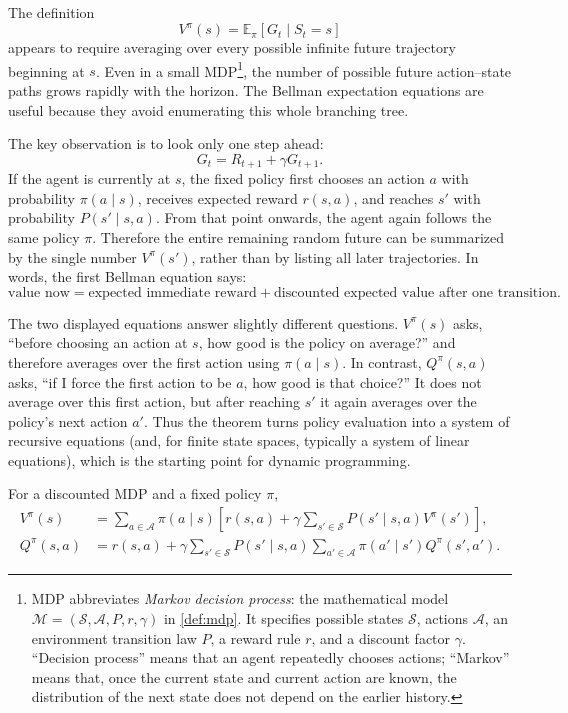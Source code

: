 \documentclass[11pt,a4paper]{article}
\theoremstyle{definition}
\begin{document}
\begin{remark}
The definition
\[
V^\pi(s)=\mathbb{E}_\pi[G_t\mid S_t=s]
\]
appears to require averaging over every possible infinite future trajectory beginning at
$s$. Even in a small MDP\footnote{MDP abbreviates \emph{Markov decision process}: the
mathematical model $\mathcal{M}=(\mathcal{S},\mathcal{A},P,r,\gamma)$ in \cref{def:mdp}.
It specifies possible states $\mathcal{S}$, actions $\mathcal{A}$, an environment transition
law $P$, a reward rule $r$, and a discount factor $\gamma$. ``Decision process'' means that
an agent repeatedly chooses actions; ``Markov'' means that, once the current state and
current action are known, the distribution of the next state does not depend on the earlier
history.}, the number of possible future action--state paths grows rapidly
with the horizon. The Bellman expectation equations are useful because they avoid enumerating
this whole branching tree.

The key observation is to look only one step ahead:
\[
G_t=R_{t+1}+\gamma G_{t+1}.
\]
If the agent is currently at $s$, the fixed policy first chooses an action $a$ with
probability $\pi(a\mid s)$, receives expected reward $r(s,a)$, and reaches $s'$ with
probability $P(s'\mid s,a)$. From that point onwards, the agent again follows the same policy
$\pi$. Therefore the entire remaining random future can be summarized by the single number
$V^\pi(s')$, rather than by listing all later trajectories. In words, the first Bellman
equation says:
\[
\text{value now}
=\text{expected immediate reward}
+\text{discounted expected value after one transition}.
\]

The two displayed equations answer slightly different questions. $V^\pi(s)$ asks, ``before
choosing an action at $s$, how good is the policy on average?'' and therefore averages over
the first action using $\pi(a\mid s)$. In contrast, $Q^\pi(s,a)$ asks, ``if I force the first
action to be $a$, how good is that choice?'' It does not average over this first action, but
after reaching $s'$ it again averages over the policy's next action $a'$. Thus the theorem
turns policy evaluation into a system of recursive equations (and, for finite state spaces,
typically a system of linear equations), which is the starting point for dynamic programming.
\end{remark}

\begin{theorem}\label{thm:bellman-expectation}
For a discounted MDP and a fixed policy $\pi$,
\[
\begin{aligned}
V^\pi(s)
&=\sum_{a\in\mathcal{A}}\pi(a\mid s)
\left[r(s,a)+\gamma\sum_{s'\in\mathcal{S}}
P(s'\mid s,a)V^\pi(s')\right],\\
Q^\pi(s,a)
&=r(s,a)+\gamma\sum_{s'\in\mathcal{S}}
P(s'\mid s,a)\sum_{a'\in\mathcal{A}}
\pi(a'\mid s')Q^\pi(s',a').
\end{aligned}
\]
\end{theorem}
\end{document}
